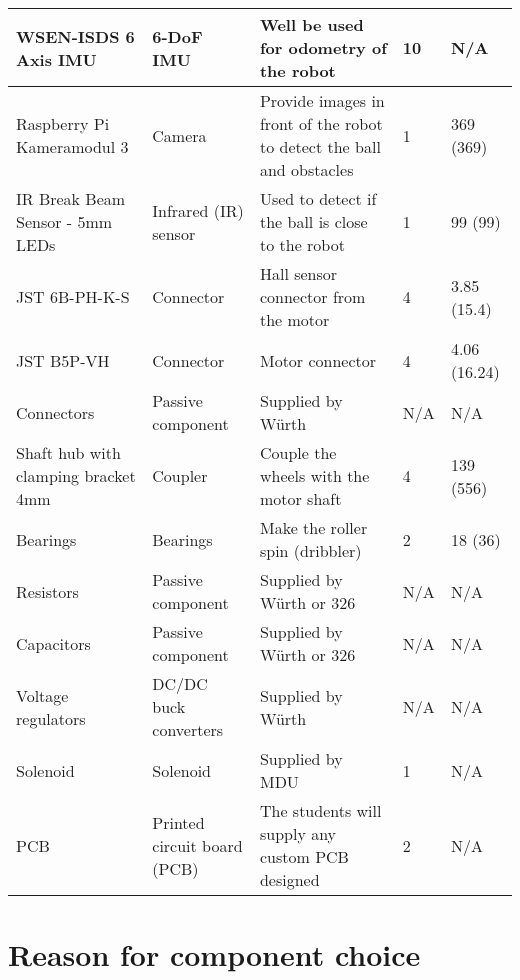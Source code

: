 \documentclass[a4paper,12pt]{article}
\begin{document}
\begin{centering}
\begin{longtable}{|p{3cm}|p{3cm}|p{3cm}|p{1cm}|p{2cm}| }
      \hline WSEN-ISDS 6 Axis IMU & 6-DoF IMU & Well be used for
      odometry of the robot & 10 & N/A\\ \hline Raspberry Pi Kameramodul
      3 & Camera & Provide images in front of the robot to detect the
      ball and obstacles & 1 & 369 (369) \\ \hline IR Break Beam Sensor
      - 5mm LEDs & Infrared (IR) sensor & Used to detect if the ball is
      close to the robot & 1 & 99 (99) \\ \hline JST 6B-PH-K-S &
      Connector & Hall sensor connector from the motor & 4 & 3.85 (15.4)
      \\ \hline JST B5P-VH & Connector & Motor connector & 4 & 4.06
      (16.24) \\ \hline Connectors & Passive component & Supplied by
      Würth & N/A & N/A \\ \hline Shaft hub with clamping bracket 4mm &
      Coupler & Couple the wheels with the motor shaft & 4 & 139 (556)
      \\ \hline Bearings & Bearings & Make the roller spin (dribbler) &
      2 & 18 (36)\\ \hline Resistors & Passive component & Supplied by
      Würth or 326 & N/A & N/A \\ \hline Capacitors & Passive component
      & Supplied by Würth or 326 & N/A & N/A \\ \hline Voltage
      regulators & DC/DC buck converters & Supplied by Würth & N/A & N/A
      \\ \hline Solenoid & Solenoid & Supplied by MDU & 1 & N/A \\
      \hline PCB & Printed circuit board (PCB) & The students will
      supply any custom PCB designed & 2 & N/A\\ \hline

    \end{longtable}
  \end{centering}

  \section*{Reason for component choice}
\end{document}
